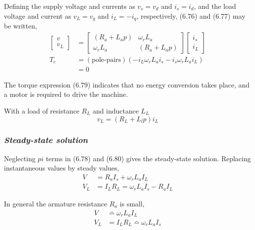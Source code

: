 \documentclass[a4paper,numbers=noenddot,12pt]{scrbook}
\begin{document}
Defining the supply voltage and currents as $v_s = v_d$ and $i_s = i_d$, and the load voltage and current as $v_L = v_q$ and $i_L = -i_q$, respectively, (6.76) and (6.77) may be written,
\begin{align}
    \begin{bmatrix}
        v \\ v_L
    \end{bmatrix}
    & = 
    \begin{bmatrix}
        (R_a + L_a p) & \omega_r L_a \\
        \omega_r L_a & (R_a + L_a p)
    \end{bmatrix}
    \begin{bmatrix}
        i_s \\ i_L
    \end{bmatrix} \\
    T_e & = (\text{pole-pairs})(- i_L \omega_r L_a i_s - i_s \omega_r L_a i_L)\\
    & = 0 \nonumber
    \label{eq:Eq6.79}
\end{align}

The torque expression (6.79) indicates that no energy conversion takes place, and a motor is required to drive the machine.

With a load of resistance $R_L$ and inductance $L_L$
\begin{equation}
    v_L = (R_L + L_l p)i_L
    \label{eq_Eq6.80}
\end{equation}

\subsubsection{\textit{Steady-state solution}} Neglecting $p i$ terms in (6.78) and (6.80) gives the steady-state solution. Replacing instantaneous values by steady values,
\begin{equation}
    \begin{aligned}
        V  & = R_a I_s + \omega_r L_ a I_L \\
        V_L & = I_L R_L = \omega_r L_a I_s - R_a I_L
    \end{aligned}
    \label{eq:Eq6.81}
\end{equation}

In general the armature resistance $R_a$ is small,
\begin{equation}
    \begin{aligned}
        V & \bumpeq \omega_r L_a I_L \\
        V_ L & =I_L R_L \bumpeq \omega_r L_a I_s 
    \end{aligned}
    \label{eq_Eq6.82}
\end{equation}
\end{document}
